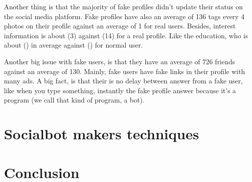 \documentclass[12pt,a4paper]{article}
\begin{document}
  Another thing is that the majority of fake profiles didn't update their status on the social
  media platform. Fake profiles have also an average of 136 tags every 4 photos on their profile
  against an average of 1 for real users.
  Besides, interest information is about (3) against (14) for a real profile. Like the education,
  who is about () in average against () for normal user.

  Another big issue with fake users, is that they have an average of 726 friends against an
  average of 130. Mainly, fake users have fake links in their profile with many ads. A big fact,
  is that their is no delay between answer from a fake user, like when you type something,
  instantly the fake profile answer because it's a program (we call that kind of program, a bot).
  \cite{facebook_user_profiles}

\section{Socialbot makers techniques}
\section{Conclusion}

\newpage

{}

\end{document}
